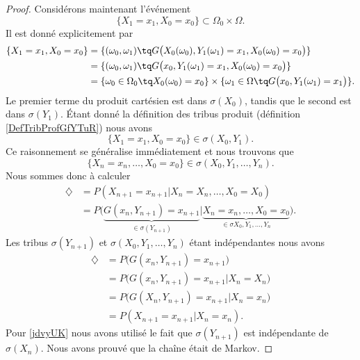 \begin{proof}
    Considérons maintenant l'événement
    \begin{equation}
        \{ X_1=x_1,X_0=x_0 \}\subset \Omega_0\times \Omega.
    \end{equation}
    Il est donné explicitement par
    \begin{subequations}
        \begin{align}
            \{ X_1=x_1,X_0=x_0 \}&=\{ (\omega_0,\omega_1)\tq G\big( X_0(\omega_0),Y_1(\omega_1)=x_1,X_0(\omega_0)=x_0 \big) \}\\
            &=\{ (\omega_0,\omega_1)\tq G\big( x_0,Y_1(\omega_1)=x_1,X_0(\omega_0)=x_0 \big) \}\\
            &=\{ \omega_0\in \Omega_0\tq X_0(\omega_0)=x_0 \}\times \{ \omega_1\in \Omega\tq G\big( x_0,Y_1(\omega_1)=x_1 \big) \}.
        \end{align}
    \end{subequations}
    Le premier terme du produit cartésien est dans \( \sigma(X_0)\), tandis que le second est dans \( \sigma(Y_1)\). Étant donné la définition des tribus produit (définition \ref{DefTribProfGfYTuR}) nous avons
    \begin{equation}
        \{ X_1=x_1,X_0=x_0 \}\in\sigma(X_0,Y_1).
    \end{equation}
    Ce raisonnement se généralise immédiatement et nous trouvons que
    \begin{equation}
        \{ X_n=x_n,\ldots, X_0=x_0 \}\in\sigma(X_0,Y_1,\ldots, Y_n).
    \end{equation}
    Nous sommes donc à calculer
    \begin{subequations}
        \begin{align}
        \diamondsuit&=P(X_{n+1}=x_{n+1}|X_n=X_n,\ldots, X_0=X_0)\\
        &=P\big( \underbrace{G(x_n,Y_{n+1})=x_{n+1}}_{\in\sigma(Y_{n+1})}|\underbrace{X_n=x_n,\ldots, X_0=x_0}_{\in\sigma X_0,Y_1,\ldots, Y_n} \big).
        \end{align}
    \end{subequations}
    Les tribus \( \sigma(Y_{n+1})\) et \( \sigma(X_0,Y_1,\ldots, Y_n)\) étant indépendantes nous avons
    \begin{subequations}
        \begin{align}
            \diamondsuit&=P\big( G(x_n,Y_{n+1})=x_{n+1} \big)\\
            &=P\big( G(x_n,Y_{n+1})=x_{n+1}|X_n=X_n \big)       \label{jdvyUK}\\
            &=P\big( G(X_n,Y_{n+1})=x_{n+1}|X_n=x_n \big)\\
            &=P(X_{n+1}=x_{n+1}|X_n=x_n).
        \end{align}
    \end{subequations}
    Pour \eqref{jdvyUK} nous avons utilisé le fait que \( \sigma(Y_{n+1})\) est indépendante de \( \sigma(X_n)\). Nous avons prouvé que la chaîne était de Markov.
\end{proof}
